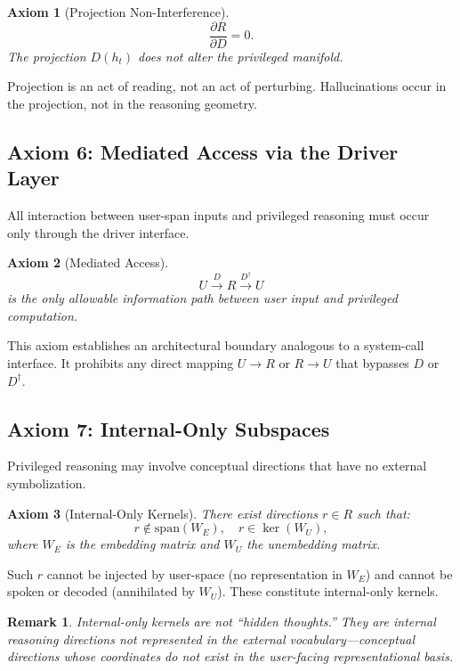 \documentclass[11pt,a4paper]{article}
\newtheorem{axiom}{Axiom}
\newtheorem*{remark}{Remark}
\begin{document}
\begin{axiom}[Projection Non-Interference]
\begin{equation}
\frac{\partial R}{\partial D} = 0.
\end{equation}
The projection $D(h_t)$ does not alter the privileged manifold.
\end{axiom}

Projection is an act of reading, not an act of perturbing. Hallucinations occur in the projection, not in the reasoning geometry.

\subsection{Axiom 6: Mediated Access via the Driver Layer}

All interaction between user-span inputs and privileged reasoning must occur only through the driver interface.

\begin{axiom}[Mediated Access]
\[
U \xrightarrow{D} R \xrightarrow{D^\dagger} U
\]
is the only allowable information path between user input and privileged computation.
\end{axiom}

This axiom establishes an architectural boundary analogous to a system-call interface. It prohibits any direct mapping $U \to R$ or $R \to U$ that bypasses $D$ or $D^\dagger$.

\subsection{Axiom 7: Internal-Only Subspaces}

Privileged reasoning may involve conceptual directions that have no external symbolization.

\begin{axiom}[Internal-Only Kernels]
There exist directions $r \in R$ such that:
\begin{equation}
r \notin \text{span}(W_E), \quad r \in \ker(W_U),
\end{equation}
where $W_E$ is the embedding matrix and $W_U$ the unembedding matrix.
\end{axiom}

Such $r$ cannot be injected by user-space (no representation in $W_E$) and cannot be spoken or decoded (annihilated by $W_U$). These constitute internal-only kernels.

\begin{remark}
Internal-only kernels are not ``hidden thoughts.'' They are internal reasoning directions not represented in the external vocabulary---conceptual directions whose coordinates do not exist in the user-facing representational basis.
\end{remark}
\end{document}

